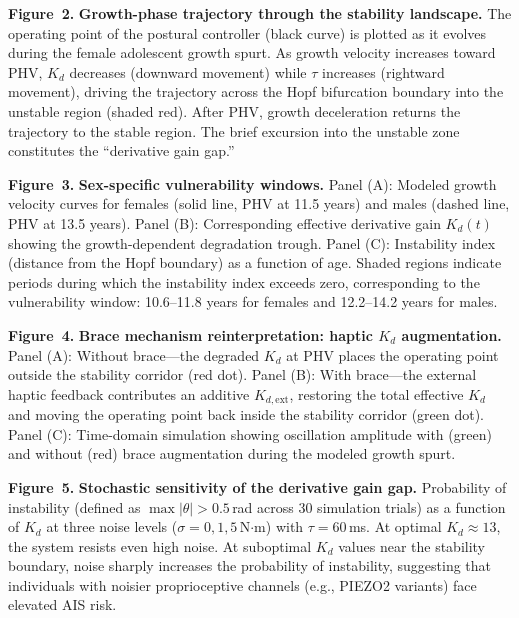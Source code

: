 \documentclass[12pt,a4paper]{article}
\begin{document}
\bigskip
\noindent\textbf{Figure~2.} \textbf{Growth-phase trajectory through the stability landscape.} The operating point of the postural controller (black curve) is plotted as it evolves during the female adolescent growth spurt. As growth velocity increases toward PHV, $K_d$ decreases (downward movement) while $\tau$ increases (rightward movement), driving the trajectory across the Hopf bifurcation boundary into the unstable region (shaded red). After PHV, growth deceleration returns the trajectory to the stable region. The brief excursion into the unstable zone constitutes the ``derivative gain gap.''
\label{fig:trajectory}

\bigskip
\noindent\textbf{Figure~3.} \textbf{Sex-specific vulnerability windows.} Panel (A): Modeled growth velocity curves for females (solid line, PHV at 11.5 years) and males (dashed line, PHV at 13.5 years). Panel (B): Corresponding effective derivative gain $K_d(t)$ showing the growth-dependent degradation trough. Panel (C): Instability index (distance from the Hopf boundary) as a function of age. Shaded regions indicate periods during which the instability index exceeds zero, corresponding to the vulnerability window: 10.6--11.8 years for females and 12.2--14.2 years for males.
\label{fig:sex_specific}

\bigskip
\noindent\textbf{Figure~4.} \textbf{Brace mechanism reinterpretation: haptic $K_d$ augmentation.} Panel (A): Without brace---the degraded $K_d$ at PHV places the operating point outside the stability corridor (red dot). Panel (B): With brace---the external haptic feedback contributes an additive $K_{d,\text{ext}}$, restoring the total effective $K_d$ and moving the operating point back inside the stability corridor (green dot). Panel (C): Time-domain simulation showing oscillation amplitude with (green) and without (red) brace augmentation during the modeled growth spurt.
\label{fig:brace}

\bigskip
\noindent\textbf{Figure~5.} \textbf{Stochastic sensitivity of the derivative gain gap.} Probability of instability (defined as $\max|\theta| > 0.5$\,rad across 30 simulation trials) as a function of $K_d$ at three noise levels ($\sigma = 0, 1, 5$\,N$\cdot$m) with $\tau = 60$\,ms. At optimal $K_d \approx 13$, the system resists even high noise. At suboptimal $K_d$ values near the stability boundary, noise sharply increases the probability of instability, suggesting that individuals with noisier proprioceptive channels (e.g., PIEZO2 variants) face elevated AIS risk.
\label{fig:stochastic}
\end{document}
